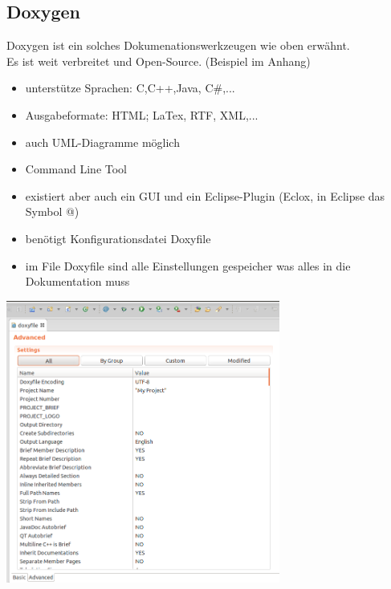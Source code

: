 \subsection{Doxygen}
Doxygen ist ein solches Dokumenationswerkzeugen wie oben erwähnt.\\
Es ist weit verbreitet und Open-Source. (Beispiel im Anhang)
\begin{itemize}
	\item unterstütze Sprachen: C,C++,Java, C\#,...
	\item Ausgabeformate: HTML; LaTex, RTF, XML,...
	\item auch UML-Diagramme möglich
	\item Command Line Tool
	\item existiert aber auch ein GUI und ein Eclipse-Plugin (Eclox, in Eclipse das Symbol @)
	\item benötigt Konfigurationsdatei Doxyfile 
	\item im File Doxyfile sind alle Einstellungen gespeicher was alles in die Dokumentation muss
\end{itemize}
\includegraphics[width=9cm]{images/doxygen_advanced.png}
